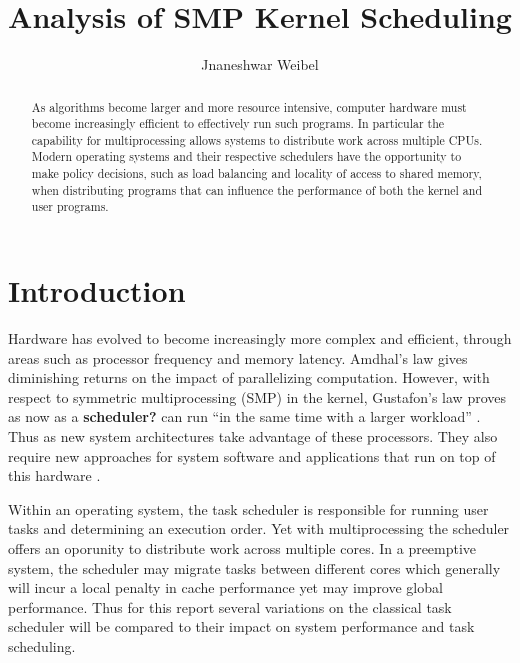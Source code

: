 \documentclass[11pt, twocolumn]{proc}
\title{Analysis of SMP Kernel Scheduling}
\author{Jnaneshwar Weibel}
\begin{document}

\maketitle

\begin{abstract}
As algorithms become larger and more resource intensive, computer hardware must become increasingly efficient to effectively run such programs.  In particular the capability for multiprocessing allows systems to distribute work across multiple CPUs.  Modern operating systems and their respective schedulers have the opportunity to make policy decisions, such as load balancing and locality of access to shared memory, when distributing programs that can influence the performance of both the kernel and user programs.
\end{abstract}



\section{Introduction}
\label{sec:introduction}
Hardware has evolved to become increasingly more complex and efficient, through areas such as processor frequency and memory latency.  Amdhal's law gives diminishing returns on the impact of parallelizing computation.  However, with respect to symmetric multiprocessing (SMP) in the kernel, Gustafon's law proves as now as a \textbf{scheduler?} can run ``in the same time with a larger workload'' \cite{gustafon}.  Thus as new system architectures take advantage of these processors.  They also require new approaches for system software and applications that run on top of this hardware \cite{nitrd}.

Within an operating system, the task scheduler is responsible for running user tasks and determining an execution order.  Yet with multiprocessing the scheduler offers an oporunity to distribute work across multiple cores.  In a preemptive system, the scheduler may migrate tasks between different cores which generally will incur a local penalty in cache performance yet may improve global performance.  Thus for this report several variations on the classical task scheduler will be compared to their impact on system performance and task scheduling.
\end{document}
